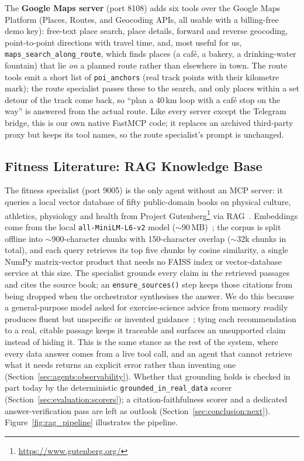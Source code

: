 The \textbf{Google Maps server} (port 8108) adds six tools over the Google Maps Platform (Places, Routes, and Geocoding APIs, all usable with a billing-free demo key): free-text place search, place details, forward and reverse geocoding, point-to-point directions with travel time, and, most useful for us, \texttt{maps\_search\_along\_route}, which finds places (a caf\'e, a bakery, a drinking-water fountain) that lie \textit{on} a planned route rather than elsewhere in town. The route tools emit a short list of \texttt{poi\_anchors} (real track points with their kilometre mark); the route specialist passes these to the search, and only places within a set detour of the track come back, so ``plan a 40\,km loop with a caf\'e stop on the way'' is answered from the actual route. Like every server except the Telegram bridge, this is our own native FastMCP code; it replaces an archived third-party proxy but keeps its tool names, so the route specialist's prompt is unchanged.

\subsection{Fitness Literature: RAG Knowledge Base}\label{sec:data:rag}

The fitness specialist (port 9005) is the only agent without an MCP server: it queries a local vector database of fifty public-domain books on physical culture, athletics, physiology and health from Project Gutenberg\footnote{\url{https://www.gutenberg.org/}} via RAG~\citep{lewis_retrieval-augmented_2020}. Embeddings come from the local \texttt{all-MiniLM-L6-v2} model ($\sim$90\,MB)~\citep{reimers_sentence-bert_2019}; the corpus is split offline into $\sim$900-character chunks with 150-character overlap ($\sim$32k chunks in total), and each query retrieves its top five chunks by cosine similarity, a single NumPy matrix-vector product that needs no FAISS index or vector-database service at this size. The specialist grounds every claim in the retrieved passages and cites the source book; an \texttt{ensure\_sources()} step keeps those citations from being dropped when the orchestrator synthesises the answer. We do this because a general-purpose model asked for exercise-science advice from memory readily produces fluent but unspecific or invented guidance~\citep{puce_harnessing_2025}; tying each recommendation to a real, citable passage keeps it traceable and surfaces an unsupported claim instead of hiding it. This is the same stance as the rest of the system, where every data answer comes from a live tool call, and an agent that cannot retrieve what it needs returns an explicit error rather than inventing one (Section~\ref{sec:agents:observability}). Whether that grounding holds is checked in part today by the deterministic \texttt{grounded\_in\_real\_data} scorer (Section~\ref{sec:evaluation:scorers}); a citation-faithfulness scorer and a dedicated answer-verification pass are left as outlook (Section~\ref{sec:conclusion:next}). Figure~\ref{fig:rag_pipeline} illustrates the pipeline.

